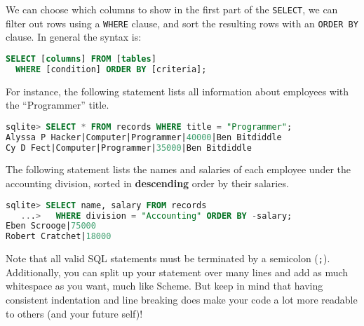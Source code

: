 We can choose which columns to show in the first part of the \texttt{SELECT}, we
can filter out rows using a \texttt{WHERE} clause, and sort the resulting rows
with an \texttt{ORDER BY} clause. In general the syntax is:

\begin{lstlisting}[language=SQL]
SELECT [columns] FROM [tables]
  WHERE [condition] ORDER BY [criteria];
\end{lstlisting}

For instance, the following statement lists all information about employees with
the ``Programmer'' title.

\begin{lstlisting}[language=SQL]
sqlite> SELECT * FROM records WHERE title = "Programmer";
Alyssa P Hacker|Computer|Programmer|40000|Ben Bitdiddle
Cy D Fect|Computer|Programmer|35000|Ben Bitdiddle
\end{lstlisting}

The following statement lists the names and salaries of each employee under the
accounting division, sorted in \textbf{descending} order by their salaries.

\begin{lstlisting}[language=SQL]
sqlite> SELECT name, salary FROM records
   ...>   WHERE division = "Accounting" ORDER BY -salary;
Eben Scrooge|75000
Robert Cratchet|18000
\end{lstlisting}

Note that all valid SQL statements must be terminated by a semicolon
(\texttt{;}). Additionally, you can split up your statement over many lines and
add as much whitespace as you want, much like Scheme. But keep in mind that
having consistent indentation and line breaking does make your code a lot more
readable to others (and your future self)!
